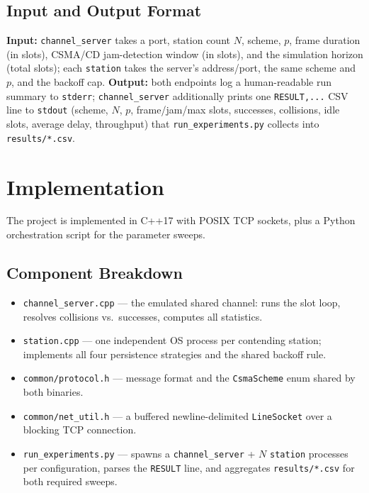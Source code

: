 \documentclass[11pt]{article}
\begin{document}
\subsection{Input and Output Format}
\textbf{Input:} \texttt{channel\_server} takes a port, station count $N$, scheme, $p$,
frame duration (in slots), CSMA/CD jam-detection window (in slots), and the simulation
horizon (total slots); each \texttt{station} takes the server's address/port, the same
scheme and $p$, and the backoff cap. \textbf{Output:} both endpoints log a human-readable
run summary to \texttt{stderr}; \texttt{channel\_server} additionally prints one
\texttt{RESULT,...} CSV line to \texttt{stdout} (scheme, $N$, $p$, frame/jam/max slots,
successes, collisions, idle slots, average delay, throughput) that
\texttt{run\_experiments.py} collects into \texttt{results/*.csv}.

\section{Implementation}
The project is implemented in C++17 with POSIX TCP sockets, plus a Python orchestration
script for the parameter sweeps.

\subsection{Component Breakdown}
\begin{itemize}[leftmargin=1.6em]
  \item \texttt{channel\_server.cpp} --- the emulated shared channel: runs the slot loop,
  resolves collisions vs.\ successes, computes all statistics.
  \item \texttt{station.cpp} --- one independent OS process per contending station;
  implements all four persistence strategies and the shared backoff rule.
  \item \texttt{common/protocol.h} --- message format and the \texttt{CsmaScheme} enum
  shared by both binaries.
  \item \texttt{common/net\_util.h} --- a buffered newline-delimited \texttt{LineSocket}
  over a blocking TCP connection.
  \item \texttt{run\_experiments.py} --- spawns a \texttt{channel\_server} + $N$
  \texttt{station} processes per configuration, parses the \texttt{RESULT} line, and
  aggregates \texttt{results/*.csv} for both required sweeps.
\end{itemize}
\end{document}
